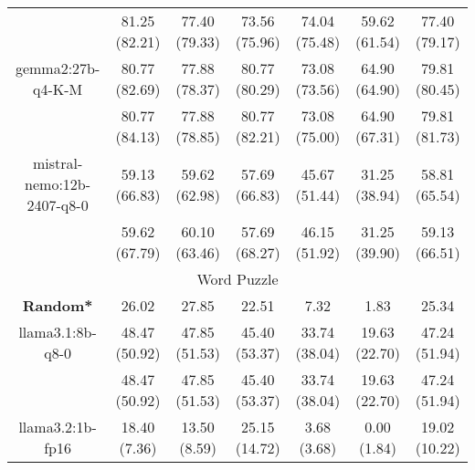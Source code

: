 \begin{table}[]
{\begin{tabular}{ccccccc}
      \multicolumn{1}{c|}{} & 81.25 (82.21) & 77.40 (79.33) & \multicolumn{1}{c|}{73.56 (75.96)} & 74.04 (75.48) & \multicolumn{1}{c|}{59.62 (61.54)} & 77.40 (79.17) \\
      \cline{1-7}


      \multicolumn{1}{c|}{gemma2:27b-q4-K-M} & 80.77 (82.69) & 77.88 (78.37) & \multicolumn{1}{c|}{80.77 (80.29)} & 73.08 (73.56) & \multicolumn{1}{c|}{64.90 (64.90)} & 79.81 (80.45) \\



      \multicolumn{1}{c|}{} & 80.77 (84.13) & 77.88 (78.85) & \multicolumn{1}{c|}{80.77 (82.21)} & 73.08 (75.00) & \multicolumn{1}{c|}{64.90 (67.31)} & 79.81 (81.73) \\
      \cline{1-7}


      \multicolumn{1}{c|}{mistral-nemo:12b-2407-q8-0} & 59.13 (66.83) & 59.62 (62.98) & \multicolumn{1}{c|}{57.69 (66.83)} & 45.67 (51.44) & \multicolumn{1}{c|}{31.25 (38.94)} & 58.81 (65.54) \\



      \multicolumn{1}{c|}{} & 59.62 (67.79) & 60.10 (63.46) & \multicolumn{1}{c|}{57.69 (68.27)} & 46.15 (51.92) & \multicolumn{1}{c|}{31.25 (39.90)} & 59.13 (66.51) \\
      \cline{1-7}

      \hline
      \multicolumn{7}{c}{Word Puzzle} \\ \hline
      \multicolumn{1}{c|}{\textbf{Random*}} & 26.02 & 27.85 & \multicolumn{1}{c|}{22.51} & 7.32 & \multicolumn{1}{c|}{1.83} & 25.34 \\ \hline

      \multicolumn{1}{c|}{llama3.1:8b-q8-0} & 48.47 (50.92) & 47.85 (51.53) & \multicolumn{1}{c|}{45.40 (53.37)} & 33.74 (38.04) & \multicolumn{1}{c|}{19.63 (22.70)} & 47.24 (51.94) \\



      \multicolumn{1}{c|}{} & 48.47 (50.92) & 47.85 (51.53) & \multicolumn{1}{c|}{45.40 (53.37)} & 33.74 (38.04) & \multicolumn{1}{c|}{19.63 (22.70)} & 47.24 (51.94) \\
      \cline{1-7}


      \multicolumn{1}{c|}{llama3.2:1b-fp16} & 18.40 (7.36) & 13.50 (8.59) & \multicolumn{1}{c|}{25.15 (14.72)} & 3.68 (3.68) & \multicolumn{1}{c|}{0.00 (1.84)} & 19.02 (10.22) \\




\end{tabular}}
\end{table}
